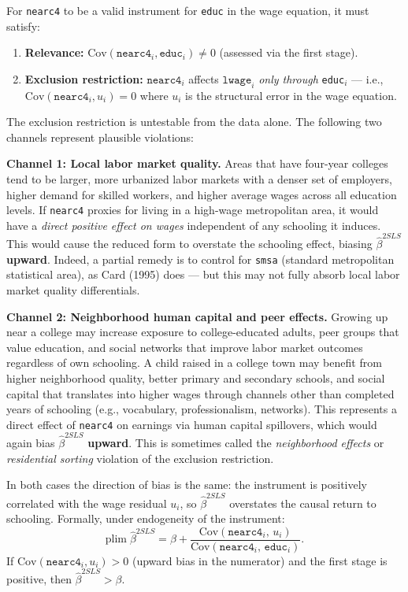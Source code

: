 \documentclass[letterpaper,12pt]{article}
\begin{document}
\begin{enumerate}[label=(\alph*)]
\medskip
For \texttt{nearc4} to be a valid instrument for \texttt{educ} in the wage equation, it must satisfy:
\begin{enumerate}
    \item \textbf{Relevance:} $\text{Cov}(\texttt{nearc4}_i, \texttt{educ}_i) \neq 0$ (assessed via the first stage).
    \item \textbf{Exclusion restriction:} $\texttt{nearc4}_i$ affects $\texttt{lwage}_i$ \emph{only through} \texttt{educ}$_i$ --- i.e., $\text{Cov}(\texttt{nearc4}_i, u_i) = 0$ where $u_i$ is the structural error in the wage equation.
\end{enumerate}
The exclusion restriction is untestable from the data alone. The following two channels represent plausible violations:

\medskip
\textbf{Channel 1: Local labor market quality.} Areas that have four-year colleges tend to be larger, more urbanized labor markets with a denser set of employers, higher demand for skilled workers, and higher average wages across all education levels. If \texttt{nearc4} proxies for living in a high-wage metropolitan area, it would have a \emph{direct positive effect on wages} independent of any schooling it induces. This would cause the reduced form to overstate the schooling effect, biasing $\hat{\beta}^{2SLS}$ \textbf{upward}. Indeed, a partial remedy is to control for \texttt{smsa} (standard metropolitan statistical area), as Card (1995) does --- but this may not fully absorb local labor market quality differentials.

\medskip
\textbf{Channel 2: Neighborhood human capital and peer effects.} Growing up near a college may increase exposure to college-educated adults, peer groups that value education, and social networks that improve labor market outcomes regardless of own schooling. A child raised in a college town may benefit from higher neighborhood quality, better primary and secondary schools, and social capital that translates into higher wages through channels other than completed years of schooling (e.g., vocabulary, professionalism, networks). This represents a direct effect of \texttt{nearc4} on earnings via human capital spillovers, which would again bias $\hat{\beta}^{2SLS}$ \textbf{upward}. This is sometimes called the \emph{neighborhood effects} or \emph{residential sorting} violation of the exclusion restriction.

\medskip
In both cases the direction of bias is the same: the instrument is positively correlated with the wage residual $u_i$, so $\hat{\beta}^{2SLS}$ overstates the causal return to schooling. Formally, under endogeneity of the instrument:
\[
\mathrm{plim}\;\hat{\beta}^{2SLS} = \beta + \frac{\text{Cov}(\texttt{nearc4}_i,\, u_i)}{\text{Cov}(\texttt{nearc4}_i,\, \texttt{educ}_i)}.
\]
If $\text{Cov}(\texttt{nearc4}_i, u_i) > 0$ (upward bias in the numerator) and the first stage is positive, then $\hat{\beta}^{2SLS} > \beta$.


\end{enumerate}
\end{document}
